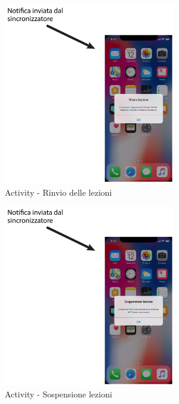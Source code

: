 \begin{figure}
	\centering
	\includegraphics[width=0.67\textwidth]{imgs/gruppo2/activity-notifiche-rinvio-lezioni}
	\caption{Activity - Rinvio delle lezioni}
	\label{fig:activity-notifiche-rinvio-lezioni}
\end{figure}

\begin{figure}
	\centering
	\includegraphics[width=0.67\textwidth]{imgs/gruppo2/activity-notifiche-sospensione-lezioni}
	\caption{Activity - Sospensione lezioni}
	\label{fig:activity-notifiche-sospensione-lezioni}
\end{figure}


